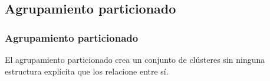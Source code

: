 \documentclass[t,compress,10pt,xcolor=dvipsnames]{beamer}
\begin{document}
%		
%			
%		
%	
	
%			
%			
%			

	\subsection{Agrupamiento particionado}
	\frame
	{
		\frametitle{Agrupamiento particionado}
		\vspace{7em}
		El agrupamiento particionado crea un conjunto  de clústeres sin ninguna estructura explícita que los relacione entre sí. 
	}
	
\end{document}
